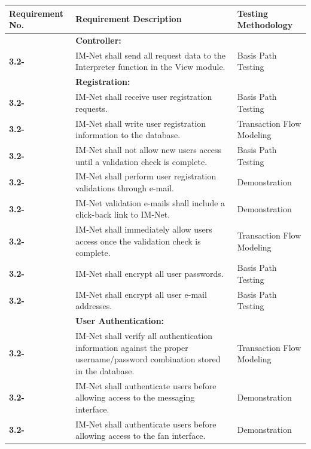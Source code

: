 \documentclass[letterpaper,12pt]{article}
\newcounter{rcounter}							%
\newcommand\rnumber{\stepcounter{rcounter}\arabic{rcounter}}
\begin{document}
{\begin{center}
\begin{tabular}{|l|p{4in}|p{2in}|}
\end{tabular} 
\end{center}

\setcounter{rcounter}{0}
\begin{center}
\begin{tabular}{|l|p{4in}|p{2in}|}
\hline 
Requirement No. & Requirement Description & Testing Methodology \\ 
\hline
& \textbf{Controller:} & \\
\hline
\textbf{3.2-\rnumber} & IM-Net shall send all request data to the Interpreter function in the View module. & Basis Path Testing \\
\hline 
& \textbf{Registration:} & \\
\hline
\textbf{3.2-\rnumber} & IM-Net shall receive user registration requests. & Basis Path Testing \\
\hline 
\textbf{3.2-\rnumber} & IM-Net shall write user registration information to the database. & Transaction Flow Modeling\\ 
\hline 
\textbf{3.2-\rnumber} & IM-Net shall not allow new users access until a validation check is complete. & Basis Path Testing \\ 
\hline 
\textbf{3.2-\rnumber} & IM-Net shall perform user registration validations through e-mail. & Demonstration \\
\hline 
\textbf{3.2-\rnumber} & IM-Net validation e-mails shall include a click-back link to IM-Net. & Demonstration \\ 
\hline 
\textbf{3.2-\rnumber} & IM-Net shall immediately allow users access once the validation check is complete. & Transaction Flow Modeling \\ 
\hline 
\textbf{3.2-\rnumber} & IM-Net shall encrypt all user passwords. & Basis Path Testing \\ 
\hline 
\textbf{3.2-\rnumber} & IM-Net shall encrypt all user e-mail addresses. & Basis Path Testing \\
\hline 
& \textbf{User Authentication:} & \\
\hline
\textbf{3.2-\rnumber} & IM-Net shall verify all authentication information against the proper username/password combination stored in the database. & Transaction Flow Modeling \\ 
\hline 
\textbf{3.2-\rnumber} & IM-Net shall authenticate users before allowing access to the messaging interface. & Demonstration \\ 
\hline 
\textbf{3.2-\rnumber} & IM-Net shall authenticate users before allowing access to the fan interface. & Demonstration \\ 

\end{tabular}
\end{center}}
\end{document}

